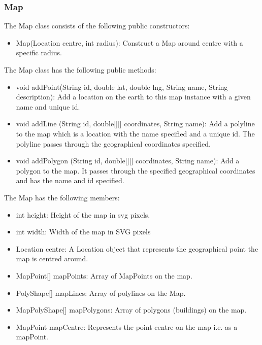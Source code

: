 \documentclass[11pt,twoside,a4paper]{article}
\begin{document}
\subsubsection{Map}
The Map class consists of the following public constructors:\\
\begin{itemize}
\item Map(Location centre, int radius): Construct a Map around centre
  with a specific radius.
\end{itemize}
The Map class has the following public methods:
\begin{itemize}
\item void addPoint(String id, double lat, double lng, String name, String
  description): Add a location on the earth to this map instance with a
  given name and unique id.
\item void addLine (String id, double[][] coordinates, String name): Add a
  polyline to the map which is a location with the name specified and a
  unique id. The polyline passes through the geographical coordinates
  specified.
\item void addPolygon (String id, double[][] coordinates, String name): Add a
  polygon to the map. It passes through the specified geographical
  coordinates and has the name and id specified. 
\end{itemize}
The Map has the following members:
\begin{itemize}
\item int height: Height of the map in svg pixels.
\item int width: Width of the map in SVG pixels
\item Location centre: A Location object that represents the
  geographical point the map is centred around.
\item MapPoint[] mapPoints: Array of MapPoints on the map.
\item PolyShape[] mapLines: Array of polylines on the Map.
\item MapPolyShape[] mapPolygons: Array of polygons (buildings) on the map.
\item MapPoint mapCentre: Represents the point centre on the map
  i.e. as a mapPoint.
\end{itemize}
\end{document}
